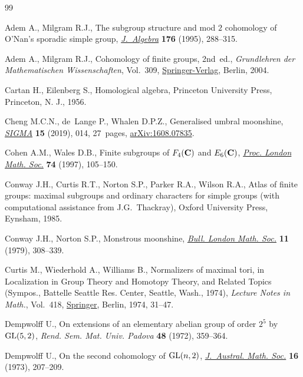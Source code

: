 \documentclass[pdftex]{sigma}
\numberwithin{equation}{section}
\newcommand\<\langle
\renewcommand\>\rangle
\begin{document}
\begin{thebibliography}{99}
\footnotesize\itemsep=0pt

Adem A., Milgram R.J., The subgroup structure and mod {$2$} cohomology of
 {O}'{N}an's sporadic simple group, \href{https://doi.org/10.1006/jabr.1995.1245}{\textit{J.~Algebra}} \textbf{176} (1995),
 288--315.

Adem A., Milgram R.J., Cohomology of finite groups, 2nd~ed., \textit{Grundlehren der
 Mathematischen Wissenschaften}, Vol.~309, \href{https://doi.org/10.1007/978-3-662-06280-7}{Springer-Verlag}, Berlin,
 2004.

Cartan H., Eilenberg S., Homological algebra, Princeton University Press,
 Princeton, N. J., 1956.

Cheng M.C.N., de~Lange P., Whalen D.P.Z., Generalised umbral moonshine,
 \href{https://doi.org/10.3842/SIGMA.2019.014}{\textit{SIGMA}} \textbf{15} (2019), 014, 27~pages, \href{https://arxiv.org/abs/1608.07835}{arXiv:1608.07835}.

Cohen A.M., Wales D.B., Finite subgroups of {$F_4({\bf C})$} and {$E_6({\bf
 C})$}, \href{https://doi.org/10.1112/S0024611597000051}{\textit{Proc. London Math. Soc.}} \textbf{74} (1997), 105--150.

Conway J.H., Curtis R.T., Norton S.P., Parker R.A., Wilson R.A., Atlas of
 finite groups: maximal subgroups and ordinary characters for simple groups
 (with computational assistance from J.G.~Thackray), Oxford University Press,
 Eynsham, 1985.

Conway J.H., Norton S.P., Monstrous moonshine, \href{https://doi.org/10.1112/blms/11.3.308}{\textit{Bull. London Math. Soc.}}
 \textbf{11} (1979), 308--339.

Curtis M., Wiederhold A., Williams B., Normalizers of maximal tori, in
 Localization in Group Theory and Homotopy Theory, and Related Topics
 ({S}ympos., {B}attelle {S}eattle {R}es. {C}enter, {S}eattle, {W}ash., 1974),
 \textit{Lecture Notes in Math.}, Vol.~418, \href{https://doi.org/10.1007/BFb0070640}{Springer}, Berlin, 1974, 31--47.

Dempwolff U., On extensions of an elementary abelian group of order {$2^{5}$}
 by {${\rm GL}(5,2)$}, \textit{Rend. Sem. Mat. Univ. Padova} \textbf{48}
 (1972), 359--364.

Dempwolff U., On the second cohomology of {${\rm GL}(n,2)$},
 \href{https://doi.org/10.1017/S1446788700014221}{\textit{J.~Austral. Math. Soc.}} \textbf{16} (1973), 207--209.


\end{thebibliography}
\end{document}
